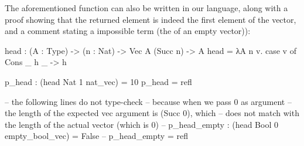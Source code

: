 The aforementioned  function can also be written in our language, along with a proof showing that the returned element is indeed the first element of the vector, and a comment stating a impossible term (the  of an empty vector)): 
\begin{piforall}
head : (A : Type) -> (n : Nat) -> Vec A (Succ n) -> A
head = λA n v. case v of {
  Cons _ h _ -> h
}

p_head : (head Nat 1 nat_vec) = 10
p_head = refl

-- the following lines do not type-check
-- because when we pass 0 as argument
-- the length of the expected vec argument is (Succ 0), which
-- does not match with the length of the actual vector (which is 0)
-- p_head_empty : (head Bool 0 empty_bool_vec) = False
-- p_head_empty = refl
\end{piforall}
